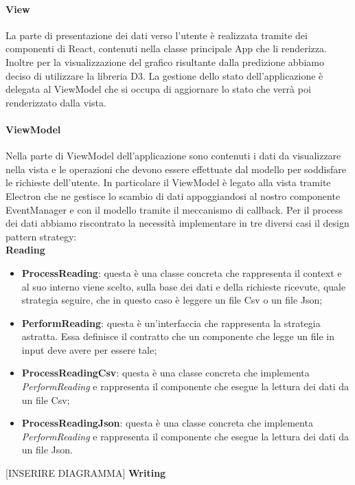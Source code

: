 			\paragraph{View}
			La parte di presentazione dei dati verso l'utente è realizzata tramite dei componenti di React, contenuti nella classe principale App che li renderizza. Inoltre per la visualizzazione del grafico risultante dalla predizione abbiamo deciso di utilizzare la libreria D3. 
			La gestione dello stato dell'applicazione è delegata al ViewModel che si occupa di aggiornare lo stato che verrà poi renderizzato dalla vista. 	
			\paragraph{ViewModel}
			Nella parte di ViewModel dell'applicazione sono contenuti i dati da visualizzare nella vista e le operazioni che devono essere effettuate dal modello per soddisfare le richieste dell'utente. In particolare il ViewModel è legato alla vista tramite Electron che ne gestisce lo scambio di dati appoggiandosi al nostro componente EventManager e con il modello tramite il meccanismo di callback.
			Per il process dei dati abbiamo riscontrato la necessità implementare in tre diversi casi il design pattern strategy: \\
			\textbf{Reading} \mbox{} \\ 
			\begin{itemize}
				\item \textbf{ProcessReading}: questa è una classe concreta che rappresenta il context e al suo interno viene scelto, sulla base dei dati e della richieste ricevute, quale strategia seguire, che in questo caso è leggere un file Csv o un file Json;
				\item \textbf{PerformReading}: questa è un'interfaccia che rappresenta la strategia astratta. Essa definisce il contratto che un componente che legge un file in input deve avere per essere tale;
				\item \textbf{ProcessReadingCsv}: questa è una classe concreta che implementa \textit{PerformReading} e rappresenta il componente che esegue la lettura dei dati da un file Csv;
				\item \textbf{ProcessReadingJson}: questa è una classe concreta che implementa \textit{PerformReading} e rappresenta il componente che esegue la lettura dei dati da un file Json.
			\end{itemize}
			[INSERIRE DIAGRAMMA]
			\textbf{Writing} \mbox{} \\ 
